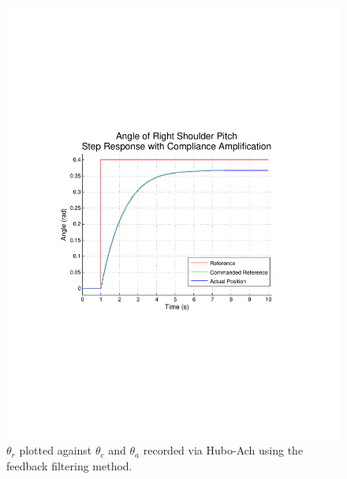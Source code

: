\begin{figure}[thpb]
  \centering
\includegraphics[width=0.8\columnwidth]{./examples/pix/RSP-Zp4-step-enc-real-crop.pdf}
  \caption{$\theta_r$ plotted against $\theta_c$ and $\theta_a$ recorded via Hubo-Ach using the feedback filtering method.}
  \label{fig:singleJointStepFilteredFeedback}
\end{figure}

